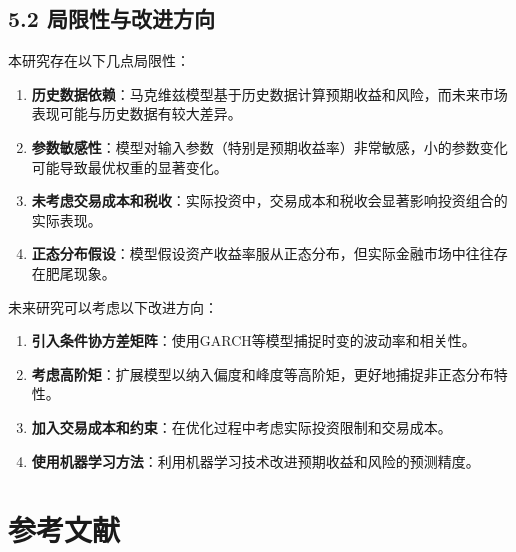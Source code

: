 \documentclass[
]{article}
\begin{document}
\subsection{5.2
局限性与改进方向}\label{ux5c40ux9650ux6027ux4e0eux6539ux8fdbux65b9ux5411}

本研究存在以下几点局限性：

\begin{enumerate}
\def\labelenumi{\arabic{enumi}.}
\item
  \textbf{历史数据依赖}：马克维兹模型基于历史数据计算预期收益和风险，而未来市场表现可能与历史数据有较大差异。
\item
  \textbf{参数敏感性}：模型对输入参数（特别是预期收益率）非常敏感，小的参数变化可能导致最优权重的显著变化。
\item
  \textbf{未考虑交易成本和税收}：实际投资中，交易成本和税收会显著影响投资组合的实际表现。
\item
  \textbf{正态分布假设}：模型假设资产收益率服从正态分布，但实际金融市场中往往存在肥尾现象。
\end{enumerate}

未来研究可以考虑以下改进方向：

\begin{enumerate}
\def\labelenumi{\arabic{enumi}.}
\item
  \textbf{引入条件协方差矩阵}：使用GARCH等模型捕捉时变的波动率和相关性。
\item
  \textbf{考虑高阶矩}：扩展模型以纳入偏度和峰度等高阶矩，更好地捕捉非正态分布特性。
\item
  \textbf{加入交易成本和约束}：在优化过程中考虑实际投资限制和交易成本。
\item
  \textbf{使用机器学习方法}：利用机器学习技术改进预期收益和风险的预测精度。
\end{enumerate}

\section{参考文献}\label{ux53c2ux8003ux6587ux732e}
\end{document}
